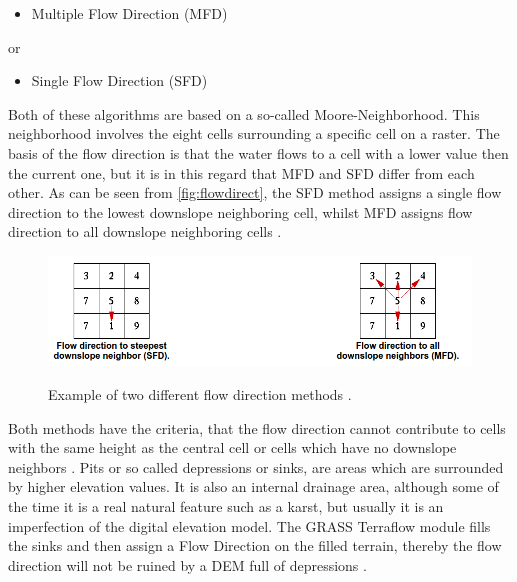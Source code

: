 \begin{itemize}
\item Multiple Flow Direction (MFD) 
\end{itemize}
or 
\begin{itemize}
\item Single Flow Direction (SFD)
\end{itemize}
 
Both of these algorithms are based on a so-called Moore-Neighborhood. This neighborhood involves the eight cells surrounding a specific cell on a raster. The basis of the flow direction is that the water flows to a cell with a lower value then the current one, but it is in this regard that MFD and SFD differ from each other. As can be seen from \autoref{fig:flowdirect}, the SFD method assigns a single flow direction to the lowest downslope neighboring cell, whilst MFD assigns flow direction to all downslope neighboring cells \citep{grassbook}. \\

\begin{figure}[t]
\centering
	{\includegraphics[width=\linewidth]{gfx/SFD_MFD.png}}
\caption{Example of two different flow direction methods \citep{sfdmfd}.}
\label{fig:flowdirect}
\end{figure}

Both methods have the criteria, that the flow direction cannot contribute to cells with the same height as the central cell or cells which have no downslope neighbors \citep{sfdmfd2}.
Pits or so called depressions or sinks, are areas which are surrounded by higher elevation values. It is also an internal drainage area, although some of the time it is a real natural feature such as a karst, but usually it is an imperfection of the digital elevation model.  The GRASS Terraflow module fills the sinks and then assign a Flow Direction on the filled terrain, thereby the flow direction will not be ruined by a DEM full of depressions \citep{sfdmfd}. 

